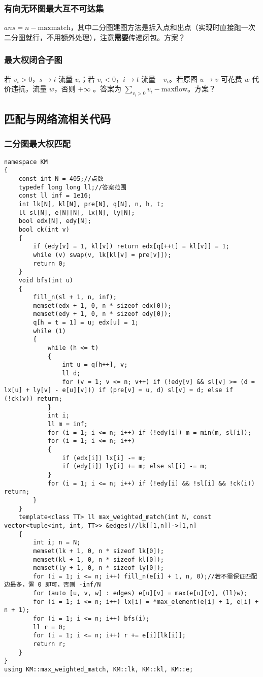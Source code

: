 \documentclass[12pt]{ctexart}
\begin{document}
\subsubsection{有向无环图最大互不可达集}

$ans=n-\text{maxmatch}$，其中二分图建图方法是拆入点和出点（实现时直接跑一次二分图就行，不用额外处理），注意\textbf{需要}传递闭包。方案？

\subsubsection{最大权闭合子图}

若 $v_i>0$，$s\to i$ 流量 $v_i$；若 $v_i<0$，$i\to t$ 流量 $-v_i$。若原图 $u\to v$ 可花费 $w$ 代价违抗，流量 $w$，否则 $+\infty$ 。答案为 $\sum\limits_{v_i>0} v_i-\text{maxflow}$。方案？

\subsection{匹配与网络流相关代码}

\subsubsection{二分图最大权匹配}

\begin{lstlisting}
namespace KM
{
	const int N = 405;//点数
	typedef long long ll;//答案范围
	const ll inf = 1e16;
	int lk[N], kl[N], pre[N], q[N], n, h, t;
	ll sl[N], e[N][N], lx[N], ly[N];
	bool edx[N], edy[N];
	bool ck(int v)
	{
		if (edy[v] = 1, kl[v]) return edx[q[++t] = kl[v]] = 1;
		while (v) swap(v, lk[kl[v] = pre[v]]);
		return 0;
	}
	void bfs(int u)
	{
		fill_n(sl + 1, n, inf);
		memset(edx + 1, 0, n * sizeof edx[0]);
		memset(edy + 1, 0, n * sizeof edy[0]);
		q[h = t = 1] = u; edx[u] = 1;
		while (1)
		{
			while (h <= t)
			{
				int u = q[h++], v;
				ll d;
				for (v = 1; v <= n; v++) if (!edy[v] && sl[v] >= (d = lx[u] + ly[v] - e[u][v])) if (pre[v] = u, d) sl[v] = d; else if (!ck(v)) return;
			}
			int i;
			ll m = inf;
			for (i = 1; i <= n; i++) if (!edy[i]) m = min(m, sl[i]);
			for (i = 1; i <= n; i++)
			{
				if (edx[i]) lx[i] -= m;
				if (edy[i]) ly[i] += m; else sl[i] -= m;
			}
			for (i = 1; i <= n; i++) if (!edy[i] && !sl[i] && !ck(i)) return;
		}
	}
	template<class TT> ll max_weighted_match(int N, const vector<tuple<int, int, TT>> &edges)//lk[[1,n]]->[1,n]
	{
		int i; n = N;
		memset(lk + 1, 0, n * sizeof lk[0]);
		memset(kl + 1, 0, n * sizeof kl[0]);
		memset(ly + 1, 0, n * sizeof ly[0]);
		for (i = 1; i <= n; i++) fill_n(e[i] + 1, n, 0);//若不需保证匹配边最多，置 0 即可，否则 -inf/N
		for (auto [u, v, w] : edges) e[u][v] = max(e[u][v], (ll)w);
		for (i = 1; i <= n; i++) lx[i] = *max_element(e[i] + 1, e[i] + n + 1);
		for (i = 1; i <= n; i++) bfs(i);
		ll r = 0;
		for (i = 1; i <= n; i++) r += e[i][lk[i]];
		return r;
	}
}
using KM::max_weighted_match, KM::lk, KM::kl, KM::e;

\end{lstlisting}
\end{document}
